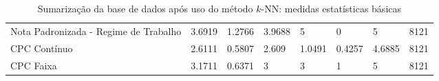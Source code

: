 \begin{table}[H]
{\begin{tabular}{@{}llllllll@{}}
Nota Padronizada - Regime de Trabalho                     & 3.6919         & 1.2766                 & 3.9688           & 5             & 0               & 5               & 8121       \\
CPC Contínuo                                              & 2.6111         & 0.5807                 & 2.609            & 1.0491        & 0.4257          & 4.6885          & 8121       \\
CPC Faixa                                                 & 3.1711         & 0.6371                 & 3                & 3             & 1               & 5               & 8121       \\ \bottomrule
\end{tabular}%
}
\caption{Sumarização da base de dados após uso do método $k$-NN: medidas estatísticas básicas}
\label{tbl: sumario-estatisico-com-knn}
\end{table}